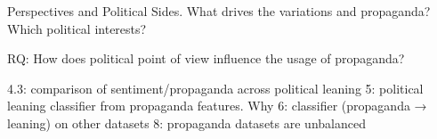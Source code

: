 Perspectives and Political Sides. What drives  the variations and propaganda? Which political interests? 

RQ:
How does political point of view influence the usage of propaganda?


4.3: comparison of sentiment/propaganda across political leaning
5: political leaning classifier from propaganda features. Why
6: classifier (propaganda → leaning) on other datasets
8: propaganda datasets are unbalanced